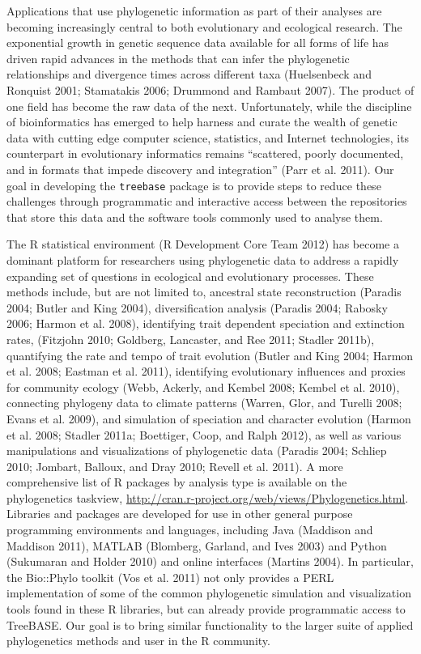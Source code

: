\documentclass[author-year, 8pt, 3p]{elsarticle} %
\begin{document}
Applications that use phylogenetic information as part of their analyses
are becoming increasingly central to both evolutionary and ecological
research. The exponential growth in genetic sequence data available for
all forms of life has driven rapid advances in the methods that can
infer the phylogenetic relationships and divergence times across
different taxa (Huelsenbeck and Ronquist 2001; Stamatakis 2006; Drummond
and Rambaut 2007). The product of one field has become the raw data of
the next. Unfortunately, while the discipline of bioinformatics has
emerged to help harness and curate the wealth of genetic data with
cutting edge computer science, statistics, and Internet technologies,
its counterpart in evolutionary informatics remains ``scattered, poorly
documented, and in formats that impede discovery and integration'' (Parr
et al. 2011). Our goal in developing the \texttt{treebase} package is to
provide steps to reduce these challenges through programmatic and
interactive access between the repositories that store this data and the
software tools commonly used to analyse them.

The R statistical environment (R Development Core Team 2012) has become
a dominant platform for researchers using phylogenetic data to address a
rapidly expanding set of questions in ecological and evolutionary
processes. These methods include, but are not limited to, ancestral
state reconstruction (Paradis 2004; Butler and King 2004),
diversification analysis (Paradis 2004; Rabosky 2006; Harmon et al.
2008), identifying trait dependent speciation and extinction rates,
(Fitzjohn 2010; Goldberg, Lancaster, and Ree 2011; Stadler 2011b),
quantifying the rate and tempo of trait evolution (Butler and King 2004;
Harmon et al. 2008; Eastman et al. 2011), identifying evolutionary
influences and proxies for community ecology (Webb, Ackerly, and Kembel
2008; Kembel et al. 2010), connecting phylogeny data to climate patterns
(Warren, Glor, and Turelli 2008; Evans et al. 2009), and simulation of
speciation and character evolution (Harmon et al. 2008; Stadler 2011a;
Boettiger, Coop, and Ralph 2012), as well as various manipulations and
visualizations of phylogenetic data (Paradis 2004; Schliep 2010;
Jombart, Balloux, and Dray 2010; Revell et al. 2011). A more
comprehensive list of R packages by analysis type is available on the
phylogenetics taskview,
\href{http://cran.r-project.org/web/views/Phylogenetics.html}{http://cran.r-project.org/web/views/Phylogenetics.html}.
Libraries and packages are developed for use in other general purpose
programming environments and languages, including Java (Maddison and
Maddison 2011), MATLAB (Blomberg, Garland, and Ives 2003) and Python
(Sukumaran and Holder 2010) and online interfaces (Martins 2004). In
particular, the Bio::Phylo toolkit (Vos et al. 2011) not only provides a
PERL implementation of some of the common phylogenetic simulation and
visualization tools found in these R libraries, but can already provide
programmatic access to TreeBASE. Our goal is to bring similar
functionality to the larger suite of applied phylogenetics methods and
user in the R community.
\end{document}

